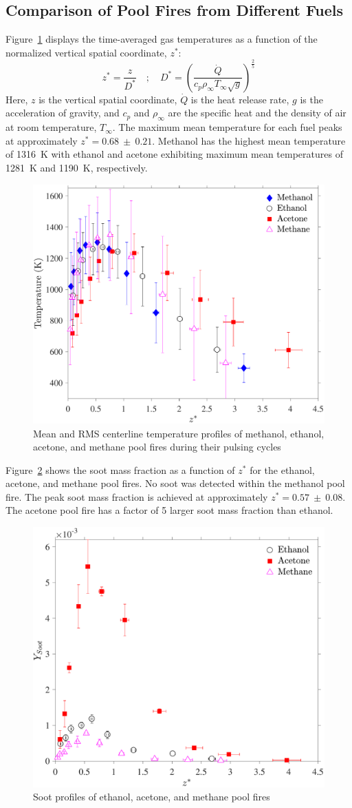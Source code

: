 \documentclass[preprint,review,12pt]{elsarticle}
\begin{document}
\subsection{Comparison of Pool Fires from Different Fuels}
\label{ssec:Fuel_comp}

Figure~\ref{fig:Temp_Comparison} displays the time-averaged gas temperatures as a function of the normalized vertical spatial coordinate, $z^*$:
\begin{equation}\label{eq:Z_Star}
z^*=\frac{z}{D^*}  \quad ; \quad  D^* = \left(\frac{\dot{Q}}{c_{p}\rho_\infty T_\infty \sqrt{g}}\right)^{\frac{2}{5}}
\end{equation}
Here, $z$ is the vertical spatial coordinate, $\dot{Q}$ is the heat release rate, $g$ is the acceleration of gravity, and $c_p$ and $\rho_\infty$ are the specific heat and the density of air at room temperature, $T_\infty$. The maximum mean temperature for each fuel peaks at approximately $z^*=0.68~\pm~0.21$. Methanol has the highest mean temperature of 1316~K with ethanol and acetone exhibiting maximum mean temperatures of 1281~K and 1190~K, respectively.

\begin{figure}[h!]
	\centering
\includegraphics[width=6.7 cm,keepaspectratio]{Temperature_Comparison.pdf}
	\caption[Mean and RMS centerline temperature profiles]{Mean and RMS centerline temperature profiles of methanol, ethanol, acetone, and methane pool fires during their pulsing cycles}
	\label{fig:Temp_Comparison}
\end{figure}
Figure~\ref{fig:Soot_Comparison} shows the soot mass fraction as a function of $z^*$ for the ethanol, acetone, and methane pool fires. No soot was detected within the methanol pool fire. The peak soot mass fraction is achieved at approximately $z^*=0.57~\pm~0.08$. The acetone pool fire has a factor of 5 larger soot mass fraction than ethanol.
\begin{figure}[h!]
	\centering
\includegraphics[width=6.7 cm,keepaspectratio]{Soot.pdf}
	\caption[Soot Mass Fraction profiles]{Soot profiles of ethanol, acetone, and methane pool fires}
	\label{fig:Soot_Comparison}
\end{figure}
\end{document}
